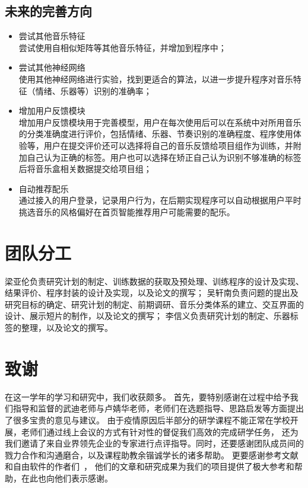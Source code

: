 \documentclass[a4paper,utf8,10pt]{article}
\newcommand{\sept}{\setlength\itemsep{-4pt}}
\begin{document}
\subsection{未来的完善方向}
\begin{itemize}
  \sept
  \item 尝试其他音乐特征\\
  尝试使用自相似矩阵等其他音乐特征，并增加到程序中；
  \item 尝试其他神经网络\\
  使用其他神经网络进行实验，找到更适合的算法，以进一步提升程序对音乐特征（情绪、乐器等）识别的准确率；
  \item 增加用户反馈模块\\
  增加用户反馈模块用于完善模型，用户在每次使用后可以在系统中对所用音乐的分类准确度进行评价，包括情绪、乐器、节奏识别的准确程度、程序使用体验等，用户在提交评价还可以选择将自己的音乐反馈给项目组作为训练，并附加自己认为正确的标签。用户也可以选择在矫正自己认为识别不够准确的标签后将音乐盒相关数据提交给项目组；
  \item 自动推荐配乐\\
  通过接入的用户登录，记录用户行为，在后期实现程序可以自动根据用户平时挑选音乐的风格偏好在首页智能推荐用户可能需要的配乐。
\end{itemize}

\section{团队分工}

梁亚伦负责研究计划的制定、训练数据的获取及预处理、训练程序的设计及实现、结果评价、程序封装的设计及实现，以及论文的撰写；
吴轩南负责问题的提出及研究目标的确定、研究计划的制定、前期调研、音乐分类体系的建立、交互界面的设计、展示短片的制作，以及论文的撰写；
李信义负责研究计划的制定、乐器标签的整理，以及论文的撰写。

\section{致谢}

在这一学年的学习和研究中，我们收获颇多。
首先，要特别感谢在过程中给予我们指导和监督的武迪老师与卢婧华老师，老师们在选题指导、思路启发等方面提出了很多宝贵的意见与建议。
由于疫情原因后半部分的研学课程不能正常在学校开展，老师们通过线上会议的方式有针对性的督促我们高效的完成研学任务，
还为我们邀请了来自业界领先企业的专家进行点评指导。同时，还要感谢团队成员间的戮力合作和沟通磨合，以及课程助教余锴诚学长的诸多帮助。
更要感谢参考文献和自由软件的作者们~\cite{tf15}\cite{CC01a}\cite{lstm15}\cite{boixx14}\cite{librosa18}\cite{lstm18}，
他们的文章和研究成果为我们的项目提供了极大参考和帮助，在此也向他们表示感谢。

{}

\end{document}
